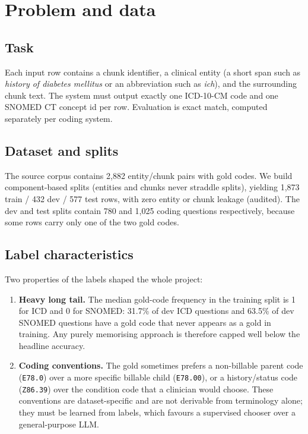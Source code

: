 \documentclass[11pt]{article}
\newcommand{\code}[1]{\texttt{#1}}
\begin{document}
\section{Problem and data}
\subsection{Task}
Each input row contains a chunk identifier, a clinical entity (a short span such as
\emph{history of diabetes mellitus} or an abbreviation such as \emph{ich}), and the surrounding
chunk text. The system must output exactly one ICD-10-CM code and one SNOMED CT concept id
per row. Evaluation is exact match, computed separately per coding system.

\subsection{Dataset and splits}
The source corpus contains 2{,}882 entity/chunk pairs with gold codes. We build
component-based splits (entities and chunks never straddle splits), yielding
1{,}873 train / 432 dev / 577 test rows, with zero entity or chunk leakage (audited).
The dev and test splits contain 780 and 1{,}025 coding questions respectively, because some
rows carry only one of the two gold codes.

\subsection{Label characteristics}
Two properties of the labels shaped the whole project:
\begin{enumerate}[leftmargin=1.2em]
  \item \textbf{Heavy long tail.} The median gold-code frequency in the training split is 1
  for ICD and 0 for SNOMED: 31.7\% of dev ICD questions and 63.5\% of dev SNOMED questions
  have a gold code that never appears as a gold in training. Any purely memorising approach
  is therefore capped well below the headline accuracy.
  \item \textbf{Coding conventions.} The gold sometimes prefers a non-billable parent code
  (\code{E78.0}) over a more specific billable child (\code{E78.00}), or a history/status code
  (\code{Z86.39}) over the condition code that a clinician would choose. These conventions
  are dataset-specific and are not derivable from terminology alone; they must be learned
  from labels, which favours a supervised chooser over a general-purpose LLM.
\end{enumerate}
\end{document}
